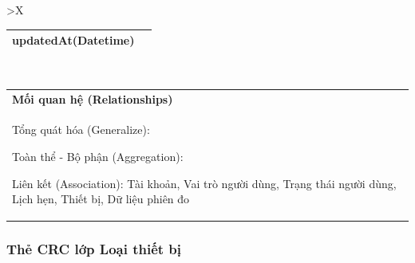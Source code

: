 \begin{xltabular}{\textwidth}{
		>{\centering\arraybackslash}X
	}
\begin{tabularx}{0.9\textwidth}{|X|X|}
		updatedAt(Datetime)
		\\ \hline
	\end{tabularx}
	\\
	\begin{tabularx}{0.9\textwidth}{|X|}
		\hline
		\textbf{Mối quan hệ (Relationships)} \\
		Tổng quát hóa (Generalize):

		Toàn thể - Bộ phận (Aggregation):

		Liên kết (Association): Tài khoản, Vai trò người dùng, Trạng thái người dùng, Lịch hẹn, Thiết bị, Dữ liệu phiên đo
		\\
		\hline
	\end{tabularx}
\end{xltabular}

\subsubsection{Thẻ CRC lớp Loại thiết bị}

